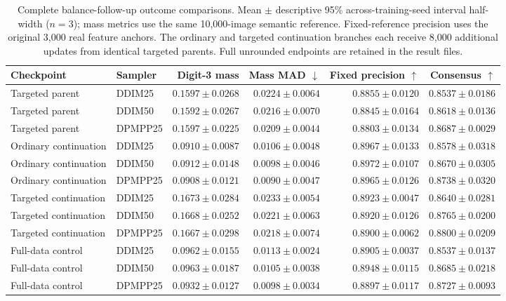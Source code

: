 \begin{table}[t]
\centering\small\setlength{\tabcolsep}{4pt}
\caption{Complete balance-follow-up outcome comparisons. Mean $\pm$ descriptive 95\% across-training-seed interval half-width ($n=3$); mass metrics use the same 10,000-image semantic reference. Fixed-reference precision uses the original 3,000 real feature anchors. The ordinary and targeted continuation branches each receive 8,000 additional updates from identical targeted parents. Full unrounded endpoints are retained in the result files.}
\label{tab:mnist_balance_all}
\begin{tabular}{llrrrr}
\toprule
Checkpoint & Sampler & Digit-3 mass & Mass MAD $\downarrow$ & Fixed precision $\uparrow$ & Consensus $\uparrow$ \\
\midrule
Targeted parent & DDIM25 & $0.1597\pm0.0268$ & $0.0224\pm0.0064$ & $0.8855\pm0.0120$ & $0.8537\pm0.0186$ \\
Targeted parent & DDIM50 & $0.1592\pm0.0267$ & $0.0216\pm0.0070$ & $0.8845\pm0.0164$ & $0.8618\pm0.0136$ \\
Targeted parent & DPMPP25 & $0.1597\pm0.0225$ & $0.0209\pm0.0044$ & $0.8803\pm0.0134$ & $0.8687\pm0.0029$ \\
Ordinary continuation & DDIM25 & $0.0910\pm0.0087$ & $0.0106\pm0.0048$ & $0.8967\pm0.0133$ & $0.8578\pm0.0318$ \\
Ordinary continuation & DDIM50 & $0.0912\pm0.0148$ & $0.0098\pm0.0046$ & $0.8972\pm0.0107$ & $0.8670\pm0.0305$ \\
Ordinary continuation & DPMPP25 & $0.0908\pm0.0121$ & $0.0090\pm0.0047$ & $0.8965\pm0.0126$ & $0.8738\pm0.0320$ \\
Targeted continuation & DDIM25 & $0.1673\pm0.0284$ & $0.0233\pm0.0054$ & $0.8923\pm0.0047$ & $0.8640\pm0.0281$ \\
Targeted continuation & DDIM50 & $0.1668\pm0.0252$ & $0.0221\pm0.0063$ & $0.8920\pm0.0126$ & $0.8765\pm0.0200$ \\
Targeted continuation & DPMPP25 & $0.1667\pm0.0298$ & $0.0218\pm0.0074$ & $0.8900\pm0.0062$ & $0.8800\pm0.0209$ \\
Full-data control & DDIM25 & $0.0962\pm0.0155$ & $0.0113\pm0.0024$ & $0.8905\pm0.0037$ & $0.8537\pm0.0137$ \\
Full-data control & DDIM50 & $0.0963\pm0.0187$ & $0.0105\pm0.0038$ & $0.8948\pm0.0115$ & $0.8685\pm0.0218$ \\
Full-data control & DPMPP25 & $0.0932\pm0.0127$ & $0.0098\pm0.0034$ & $0.8897\pm0.0117$ & $0.8727\pm0.0093$ \\
\bottomrule
\end{tabular}
\end{table}
